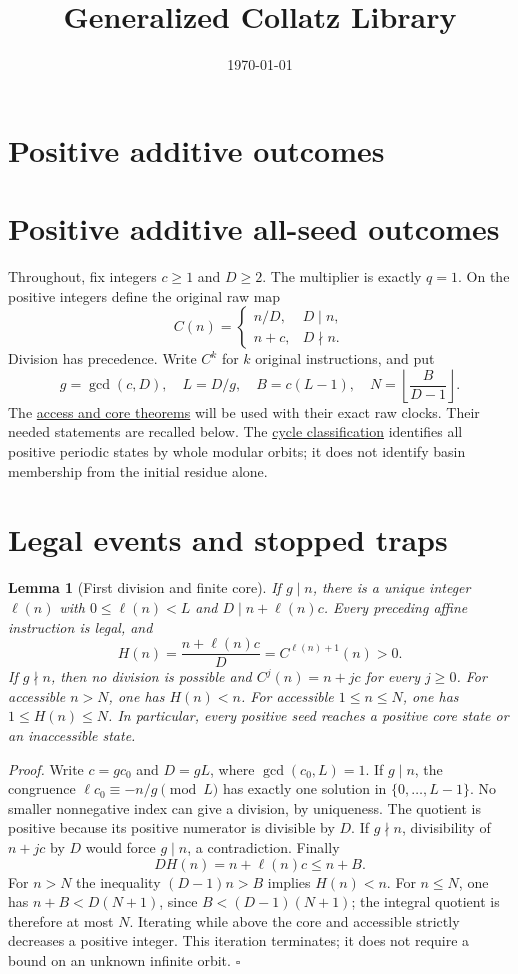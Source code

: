 \documentclass[11pt,letterpaper]{article}
\title{Generalized Collatz Library}
\author{}
\date{\today}
\newtheorem{lemma}[theorem]{Lemma}
\newenvironment{proof}{\noindent\textit{Proof.}}{\hfill\(\square\)}
\begin{document}
\maketitle
\section*{Positive additive outcomes}

\section*{Positive additive all-seed outcomes}

Throughout, fix integers $c\ge1$ and $D\ge2$. The multiplier is exactly $q=1$.
On the positive integers define the original raw map
\[
 C(n)=\begin{cases}n/D,&D\mid n,\\ n+c,&D\nmid n.\end{cases}
\]
Division has precedence. Write $C^k$ for $k$ original instructions, and put
\[
 g=\gcd(c,D),\quad L=D/g,\quad B=c(L-1),\quad
 N=\left\lfloor\frac{B}{D-1}\right\rfloor.
\]
The \href{../../QCD.Additive.001/tex/Additive.tex}{access and core theorems}
will be used with their exact raw clocks. Their needed statements are
recalled below. The
\href{../../QCD.Additive.002/tex/AdditiveCycles.tex}{cycle classification}
identifies all positive periodic states by whole modular orbits; it does
not identify basin membership from the initial residue alone.

\section{Legal events and stopped traps}

\begin{lemma}[First division and finite core]\label{LemmaAccess}
If $g\mid n$, there is a unique integer $\ell(n)$ with
$0\le\ell(n)<L$ and $D\mid n+\ell(n)c$. Every preceding affine instruction is
legal, and
\[
 H(n)=\frac{n+\ell(n)c}{D}=C^{\ell(n)+1}(n)>0.
\]
If $g\nmid n$, then no division is possible and $C^j(n)=n+jc$ for every
$j\ge0$. For accessible $n>N$, one has $H(n)<n$. For accessible
$1\le n\le N$, one has $1\le H(n)\le N$. In particular, every positive seed
reaches a positive core state or an inaccessible state.
\end{lemma}

\begin{proof}
Write $c=gc_0$ and $D=gL$, where $\gcd(c_0,L)=1$. If $g\mid n$, the
congruence $\ell c_0\equiv-n/g\pmod L$ has exactly one solution in
$\{0,\ldots,L-1\}$. No smaller nonnegative index can give a division,
by uniqueness. The quotient is positive because its positive numerator
is divisible by $D$. If $g\nmid n$, divisibility of $n+jc$ by $D$ would
force $g\mid n$, a contradiction. Finally
\[
 DH(n)=n+\ell(n)c\le n+B.
\]
For $n>N$ the inequality $(D-1)n>B$ implies $H(n)<n$.
For $n\le N$, one has $n+B<D(N+1)$, since $B<(D-1)(N+1)$;
the integral quotient is therefore at most $N$. Iterating while above the
core and accessible strictly decreases a positive integer. This iteration
terminates; it does not require a bound on an unknown infinite orbit.
\end{proof}
\end{document}
